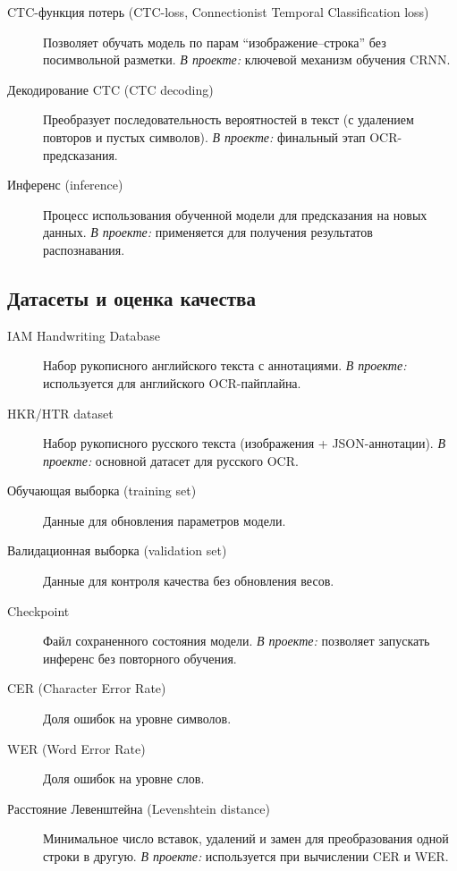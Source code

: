 \documentclass[12pt,a4paper]{article}
\begin{document}
\begin{description}
    \item[CTC-функция потерь (CTC-loss, Connectionist Temporal Classification loss)] \cite{ctc2006}
    Позволяет обучать модель по парам ``изображение--строка'' без посимвольной разметки.
    \textit{В проекте:} ключевой механизм обучения CRNN.

    \item[Декодирование CTC (CTC decoding)]
    Преобразует последовательность вероятностей в текст (с удалением повторов и пустых символов).
    \textit{В проекте:} финальный этап OCR-предсказания.

    \item[Инференс (inference)]
    Процесс использования обученной модели для предсказания на новых данных.
    \textit{В проекте:} применяется для получения результатов распознавания.
\end{description}

\subsection{Датасеты и оценка качества}

\begin{description}
    \item[IAM Handwriting Database]\cite{marti2002iam}
    Набор рукописного английского текста с аннотациями.
    \textit{В проекте:} используется для английского OCR-пайплайна.

    \item[HKR/HTR dataset]\cite{hkr2024}
    Набор рукописного русского текста (изображения + JSON-аннотации).
    \textit{В проекте:} основной датасет для русского OCR.

    \item[Обучающая выборка (training set)]
    Данные для обновления параметров модели.

    \item[Валидационная выборка (validation set)]
    Данные для контроля качества без обновления весов.

    \item[Checkpoint]
    Файл сохраненного состояния модели.
    \textit{В проекте:} позволяет запускать инференс без повторного обучения.

    \item[CER (Character Error Rate)]
    Доля ошибок на уровне символов.

    \item[WER (Word Error Rate)]
    Доля ошибок на уровне слов.

    \item[Расстояние Левенштейна (Levenshtein distance)]
    Минимальное число вставок, удалений и замен для преобразования одной строки в другую.
    \textit{В проекте:} используется при вычислении CER и WER.
\end{description}
\end{document}
